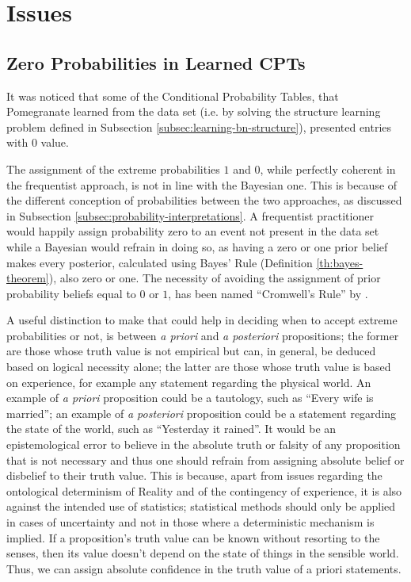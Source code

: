 \section{Issues} \label{sec:issues}

\subsection{Zero Probabilities in Learned CPTs}
It was noticed that some of the Conditional Probability Tables, that Pomegranate learned from the data set (i.e. by solving the structure learning problem defined in Subsection \ref{subsec:learning-bn-structure}), presented entries with $0$ value.

The assignment of the extreme probabilities $1$ and $0$, while perfectly coherent in the frequentist approach, is not in line with the Bayesian one.
This is because of the different conception of probabilities between the two approaches, as discussed in Subsection \ref{subsec:probability-interpretations}.
A frequentist practitioner would happily assign probability zero to an event not present in the data set while a Bayesian would refrain in doing so, as having a zero or one prior belief makes every posterior, calculated using Bayes' Rule (Definition \ref{th:bayes-theorem}), also zero or one.
The necessity of avoiding the assignment of prior probability beliefs equal to $0$ or $1$, has been named \enquote{Cromwell's Rule} by \citet{Jackman2009}.

A useful distinction to make that could help in deciding when to accept extreme probabilities or not, is between \textit{a priori} and \textit{a posteriori} propositions; the former are those whose truth value is not empirical but can, in general, be deduced based on logical necessity alone; the latter are those whose truth value is based on experience, for example any statement regarding the physical world.
An example of \textit{a priori} proposition could be a tautology, such as \enquote{Every wife is married}; an example of \textit{a posteriori} proposition could be a statement regarding the state of the world, such as \enquote{Yesterday it rained}.
It would be an epistemological error to believe in the absolute truth or falsity of any proposition that is not necessary and thus one should refrain from assigning absolute belief or disbelief to their truth value.
This is because, apart from issues regarding the ontological determinism of Reality and of the contingency of experience, it is also against the intended use of statistics; statistical methods should only be applied in cases of uncertainty and not in those where a deterministic mechanism is implied.
If a proposition's truth value can be known without resorting to the senses, then its value doesn't depend on the state of things in the sensible world.
Thus, we can assign absolute confidence in the truth value of a priori statements.

